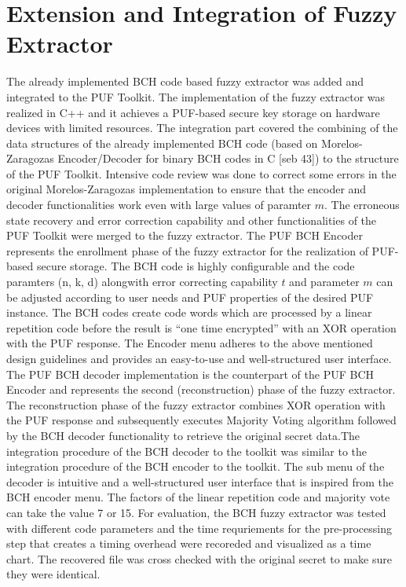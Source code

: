 \section{Extension and Integration of Fuzzy Extractor}
The already implemented BCH code based fuzzy extractor was added and integrated to the PUF Toolkit. The implementation of the fuzzy extractor was realized in C++ and it achieves a PUF-based secure key storage on hardware devices with limited resources. The integration part covered the combining of the data structures of the already implemented BCH code (based on Morelos-Zaragozas Encoder/Decoder for binary BCH codes in C [seb 43]) to the structure of the PUF Toolkit. Intensive code review was
done to correct some errors in the original Morelos-Zaragozas implementation to ensure that the encoder and decoder functionalities work even with large values of paramter $m$. The erroneous state recovery and error correction capability and other functionalities of the PUF Toolkit were merged to the fuzzy extractor. The PUF BCH Encoder represents the enrollment phase of the fuzzy extractor for the realization of PUF-based secure storage. The BCH code is highly configurable and the code
paramters (n, k, d) alongwith error correcting capability $t$ and parameter $m$ can be adjusted according to user needs and PUF properties of the desired PUF instance. The BCH codes create code words which are processed by a linear repetition code before the result is ``one time encrypted'' with an XOR operation with the PUF response. The Encoder menu adheres to the above mentioned design guidelines and provides an easy-to-use and well-structured user interface. The PUF BCH decoder
implementation is the counterpart of the PUF BCH Encoder and represents the second (reconstruction) phase of the fuzzy extractor. The reconstruction phase of the fuzzy extractor combines XOR operation with the PUF response and subsequently executes Majority Voting algorithm followed by the BCH decoder functionality to retrieve the original secret data.The integration procedure of the BCH decoder to the toolkit was similar to the integration procedure of the BCH encoder to the toolkit. The sub menu of the
decoder is intuitive and a well-structured user interface that is inspired from the BCH encoder menu. The factors of the linear repetition code and majority vote can take the value 7 or 15. For evaluation, the BCH fuzzy extractor was tested with different code parameters and the time requriements for the pre-processing step that creates a timing overhead were recoreded and visualized as a time chart. The recovered file was cross checked with the original secret to make sure they were
identical.\\

